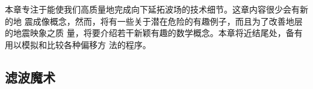 本章专注于能使我们高质量地完成向下延拓波场的技术细节。这章内容很少会有新的地
震成像概念，然而，将有一些关于潜在危险的有趣例子，而且为了改善地层的地震映象之质
量，将要介绍若干新颖有趣的数学概念。本章将近结尾处，备有用以模拟和比较各种偏移方
法的程序。

\subsection{滤波魔术}
\label{sec:4.0.1}

%
%
